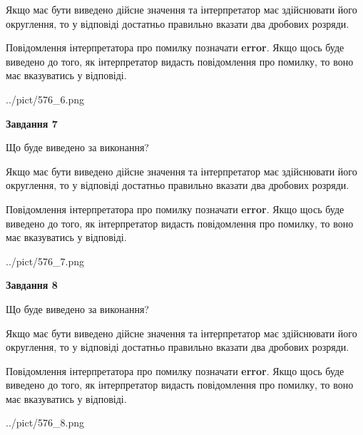 \documentclass[12pt, ukrainian]{article}
\begin{document}
{\begin {Large}
Якщо має бути виведено дійсне значення та інтерпретатор має здійснювати його округлення, 
то у відповіді достатньо правильно вказати два дробових розряди.

Повідомлення інтерпретатора про помилку позначати \textbf{error}.
Якщо щось буде виведено до того, як інтерпретатор видасть повідомлення про помилку, 
то воно має вказуватись у відповіді. \par

\begin{center}
	{../pict/576_6.png}
\end{center}
\newpage

{\begin {center}\textbf{Завдання 7}\end {center}}\par
Що буде виведено за виконання? \par

Якщо має бути виведено дійсне значення та інтерпретатор має здійснювати його округлення, 
то у відповіді достатньо правильно вказати два дробових розряди.

Повідомлення інтерпретатора про помилку позначати \textbf{error}.
Якщо щось буде виведено до того, як інтерпретатор видасть повідомлення про помилку, 
то воно має вказуватись у відповіді. \par

\begin{center}
	{../pict/576_7.png}
\end{center}
\newpage

{\begin {center}\textbf{Завдання 8}\end {center}}\par
Що буде виведено за виконання? \par

Якщо має бути виведено дійсне значення та інтерпретатор має здійснювати його округлення, 
то у відповіді достатньо правильно вказати два дробових розряди.

Повідомлення інтерпретатора про помилку позначати \textbf{error}.
Якщо щось буде виведено до того, як інтерпретатор видасть повідомлення про помилку, 
то воно має вказуватись у відповіді. \par

\begin{center}
	{../pict/576_8.png}
\end{center}
\newpage


\end{Large}}
\end{document}
